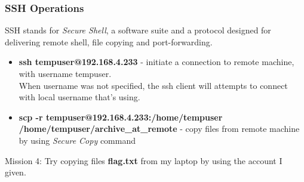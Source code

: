 \documentclass[11pt]{beamer}
\begin{document}
\begin{frame}
\frametitle{SSH Operations}
SSH stands for \textit{Secure Shell}, a software suite and a protocol designed for delivering remote shell, file copying and port-forwarding.
\begin{itemize}
\item \textbf{ssh tempuser@192.168.4.233} - initiate a connection to remote machine, with username tempuser.\\
When username was not specified, the ssh client will attempts to connect with local username that's using.
\item \textbf{scp -r tempuser@192.168.4.233:/home/tempuser /home/tempuser/archive\_at\_remote} - copy files from remote machine by using \textit{Secure Copy} command
\end{itemize}

Mission 4: Try copying files \textbf{flag.txt} from my laptop by using the account I given.
\end{frame}
\end{document}
